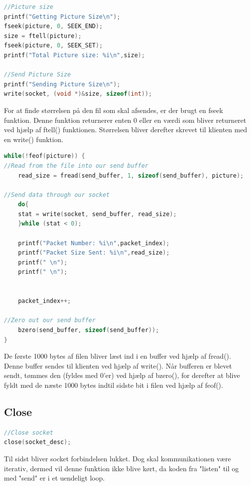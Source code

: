 \documentclass[12pt,fleqn,a4paper]{report}
\begin{document}
\begin{framed}
\begin{lstlisting}[language=C++]
//Picture size
printf("Getting Picture Size\n");
fseek(picture, 0, SEEK_END);
size = ftell(picture);
fseek(picture, 0, SEEK_SET);
printf("Total Picture size: %i\n",size);

//Send Picture Size
printf("Sending Picture Size\n");
write(socket, (void *)&size, sizeof(int));
\end{lstlisting}
\end{framed}
For at finde størrelsen på den fil som skal afsendes, er der brugt en fseek funktion. Denne funktion returnerer enten 0 eller en værdi som bliver returneret ved hjælp af ftell() funktionen. 
Størrelsen bliver derefter skrevet til klienten med en write() funktion.
\newpage
\begin{framed}
\begin{lstlisting}[language=C++]
while(!feof(picture)) {
//Read from the file into our send buffer
	read_size = fread(send_buffer, 1, sizeof(send_buffer), picture);
	
//Send data through our socket
	do{
	stat = write(socket, send_buffer, read_size);
	}while (stat < 0);
	
	printf("Packet Number: %i\n",packet_index);
	printf("Packet Size Sent: %i\n",read_size);
	printf(" \n");
	printf(" \n");
	
	
	packet_index++;
	
//Zero out our send buffer
	bzero(send_buffer, sizeof(send_buffer));
}
\end{lstlisting}
\end{framed}
De første 1000 bytes af filen bliver læst ind i en buffer ved hjælp af fread(). Denne buffer sendes til klienten ved hjælp af write(). Når bufferen er blevet sendt, tømmes den (fyldes med 0'er) ved hjælp af bzero(), for derefter at blive fyldt med de næste 1000 bytes indtil sidste bit i filen ved hjælp af feof().

 
\subsection{Close}
\begin{framed}
\begin{lstlisting}[language=C++]
//Close socket
close(socket_desc);
\end{lstlisting}
\end{framed}

Til sidst bliver socket forbindelsen lukket.
Dog skal kommunikationen være iterativ, dermed vil denne funktion ikke blive kørt, da koden fra "listen" til og med "send" er i et uendeligt loop.
\newpage
\end{document}
